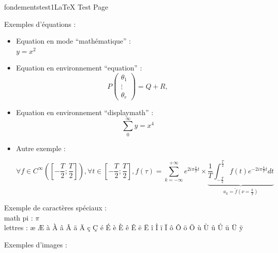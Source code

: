 \documentclass{ra2018}
\begin{document}
\begin{module}{fondements}{test1}{LaTeX Test Page}


Exemples d'équations :
  
\begin{itemize}
\item Equation en mode ``mathématique'' :\\

$y=x^2$  

\item Equation en environnement ``equation'' : \\

\begin{equation}
  P \left(\begin{array} {c}
     \theta_{1} \\ \vdots  \\ \theta_{r}  
\end{array}
  \right) = Q + R, \label{noisident1}
\end{equation}

\item Equation en environnement ``displaymath'' : \\

\begin{displaymath}
\sum_{0}^{\infty} y = x^4
\end{displaymath}

\item Autre exemple :  

\[ \forall f\in C^\infty\left(\left[-\frac{T}{2};\frac{T}{2}\right]\right),
   \forall t\in \left[-\frac{T}{2};\frac{T}{2}\right],
   f(\tau) = \sum_{k = -\infty}^{+\infty} e^{2i\pi\frac{k}{T}t} \times
   \underbrace{\frac{1}{T}
               \int_{-\frac{T}{2}}^{\frac{T}{2}} f(t) e^{-2i\pi\frac{k}{T}t} dt
              }_{a_k = \tilde{f}\left(\nu = \frac{k}{T}\right)}
\]

\end{itemize}  

Exemple de caractères spéciaux : \\  

math pi : $\pi$ \\

lettres : æ Æ à À â Â ä Ä ç Ç é É è È ê Ê ë Ë î Î ï Ï ô Ô ö Ö ù Ù û Û ü Ü ÿ {\th} {\TH}

Exemples d'images :
  
\begin{itemize}


\end{itemize}
\end{module}
\end{document}
